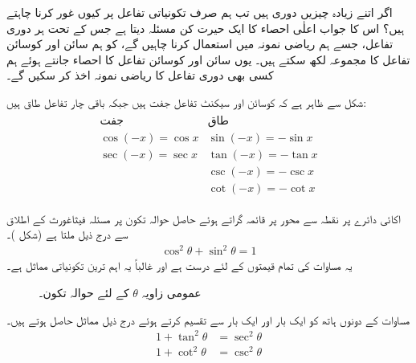 اگر اتنے زیادہ چیزیں دوری ہیں تب ہم صرف تکونیاتی تفاعل پر کیوں غور کرنا چاہتے ہیں؟ اس کا جواب اعلٰی احصاء کا ایک حیرت کن مسئلہ دیتا ہے جس کے تحت ہر دوری تفاعل، جسے ہم ریاضی نمونہ میں استعمال کرنا چاہیں گے، کو ہم سائن اور کوسائن تفاعل کا مجموعہ لکھ سکتے ہیں۔  یوں سائن اور کوسائن تفاعل کا احصاء جانتے ہوئے ہم کسی بھی دوری تفاعل کا ریاضی نمونہ اخذ کر سکیں گے۔

شکل  سے ظاہر ہے کہ کوسائن اور سیکنٹ تفاعل جفت ہیں جبکہ باقی چار تفاعل طاق ہیں:
\begin{align*}
\begin{array}{ll}
\text{جفت}&\text{طاق}\\
\hline
\cos(-x)=\cos x &\sin(-x)=-\sin x\\
\sec(-x)=\sec x&\tan(-x)=-\tan x\\
&\csc(-x)=-\csc x\\
&\cot(-x)=-\cot x
\end{array}
\end{align*}

اکائی دائرے پر نقطہ  سے  محور پر قائمہ گراتے ہوئے حاصل حوالہ تکون پر مسئلہ فیثاغورث کے اطلاق سے درج ذیل ملتا ہے (شکل )۔
\begin{align}\label{مساوات_ابتدا_مماثل_الف}
\cos^2\theta +\sin^2\theta=1
\end{align}
یہ مساوات  کی تمام قیمتوں  کے لئے درست ہے اور غالباً  یہ اہم ترین تکونیاتی مماثل ہے۔
\begin{figure}
\centering
{}
\caption{عمومی زاویہ $\theta$ کے لئے حوالہ تکون۔}
\label{شکل_ابتدا_عمومی_زاویہ_تکون}
\end{figure}

مساوات  کے دونوں ہاتھ کو ایک بار  اور ایک بار  سے تقسیم کرتے ہوئے درج ذیل مماثل حاصل ہوتے ہیں۔
\begin{align*}
1+\tan^2\theta&=\sec^2\theta\\
1+\cot^2\theta&=\csc^2\theta
\end{align*}


